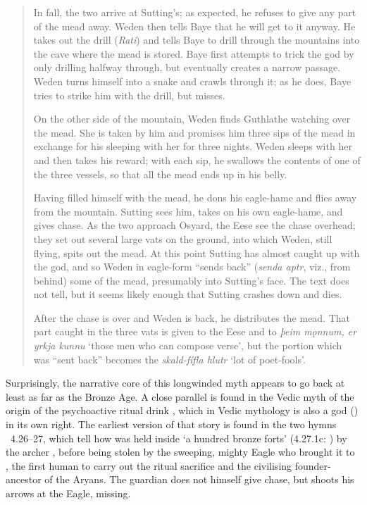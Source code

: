 \begin{small}
\begin{quote}
	In fall, the two arrive at Sutting’s; as expected, he refuses to give any part of the mead away.  Weden then tells Baye that he will get to it anyway.  He takes out the drill  (\emph{Rati}) and tells Baye to drill through the mountains into the cave where the mead is stored.  Baye first attempts to trick the god by only drilling halfway through, but eventually creates a narrow passage.  Weden turns himself into a snake and crawls through it; as he does, Baye tries to strike him with the drill, but misses.

	On the other side of the mountain, Weden finds Guthlathe watching over the mead.  She is taken by him and promises him three sips of the mead in exchange for his sleeping with her for three nights.  Weden sleeps with her and then takes his reward; with each sip, he swallows the contents of one of the three vessels, so that all the mead ends up in his belly.

	Having filled himself with the mead, he dons his eagle-hame and flies away from the mountain.  Sutting sees him, takes on his own eagle-hame, and gives chase.  As the two approach Osyard, the Eese see the chase overhead; they set out several large vats on the ground, into which Weden, still flying, spits out the mead.  At this point Sutting has almost caught up with the god, and so Weden in eagle-form “sends back” (\emph{senda aptr}, viz., from behind) some of the mead, presumably into Sutting’s face.  The text does not tell, but it seems likely enough that Sutting crashes down and dies.

	After the chase is over and Weden is back, he distributes the mead.  That part caught in the three vats is given to the Eese and to \emph{þeim mǫnnum, er yrkja kunnu} ‘those men who can compose verse’, but the portion which was “sent back” becomes the \emph{skald-fífla hlutr} ‘lot of poet-fools’.
	\end{quote}
\end{small}

Surprisingly, the narrative core of this longwinded myth appears to go back at least as far as the Bronze Age.  A close parallel is found in the Vedic myth of the origin of the psychoactive ritual drink , which in Vedic mythology is also a god () in its own right.  The earliest version of that story is found in the two hymns \Rigveda\ 4.26--27, which tell how  was held inside ‘a hundred bronze forts’ (4.27.1c: ) by the archer , before being stolen by the sweeping, mighty Eagle who brought it to , the first human to carry out the ritual sacrifice and the civilising founder-ancestor of the Aryans.
The guardian  does not himself give chase, but shoots his arrows at the Eagle, missing.

